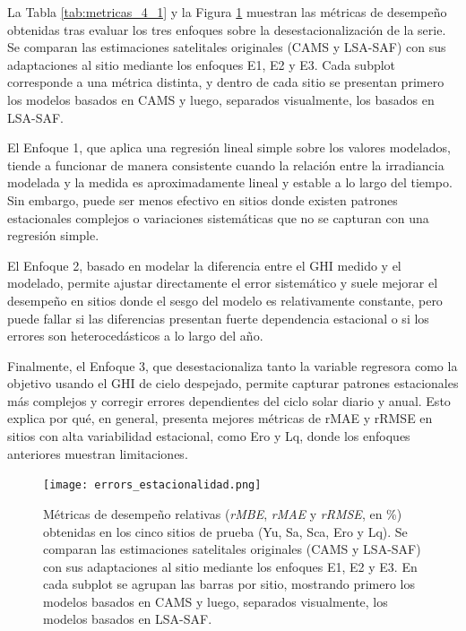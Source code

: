 La Tabla \ref{tab:metricas_4_1} y la Figura \ref{fig:metricas_estacionalidad} muestran las métricas de desempeño obtenidas tras evaluar los tres enfoques sobre la desestacionalización de la serie. Se comparan las estimaciones satelitales originales (CAMS y LSA-SAF) con sus adaptaciones al sitio mediante los enfoques E1, E2 y E3. 
Cada subplot corresponde a una métrica distinta, y dentro de cada sitio se presentan primero los modelos basados en CAMS y luego, separados visualmente, los basados en LSA-SAF. 

El Enfoque 1, que aplica una regresión lineal simple sobre los valores modelados, tiende a funcionar de manera consistente cuando la relación entre la irradiancia modelada y la medida es aproximadamente lineal y estable a lo largo del tiempo. Sin embargo, puede ser menos efectivo en sitios donde existen patrones estacionales complejos o variaciones sistemáticas que no se capturan con una regresión simple. 

El Enfoque 2, basado en modelar la diferencia entre el GHI medido y el modelado, permite ajustar directamente el error sistemático y suele mejorar el desempeño en sitios donde el sesgo del modelo es relativamente constante, pero puede fallar si las diferencias presentan fuerte dependencia estacional o si los errores son heterocedásticos a lo largo del año.

Finalmente, el Enfoque 3, que desestacionaliza tanto la variable regresora como la objetivo usando el GHI de cielo despejado, permite capturar patrones estacionales más complejos y corregir errores dependientes del ciclo solar diario y anual. Esto explica por qué, en general, presenta mejores métricas de rMAE y rRMSE en sitios con alta variabilidad estacional, como Ero y Lq, donde los enfoques anteriores muestran limitaciones.\\





\begin{figure}
    \centering
    \texttt{[image: errors\_estacionalidad.png]}
    \caption{Métricas de desempeño relativas (\textit{rMBE}, \textit{rMAE} y \textit{rRMSE}, en \%) obtenidas en los cinco sitios de prueba (Yu, Sa, Sca, Ero y Lq). 
    Se comparan las estimaciones satelitales originales (CAMS y LSA-SAF) con sus adaptaciones al sitio mediante los enfoques E1, E2 y E3. 
    En cada subplot se agrupan las barras por sitio, mostrando primero los modelos basados en CAMS y luego, separados visualmente, los modelos basados en LSA-SAF.}
    \label{fig:metricas_estacionalidad}
\end{figure}


